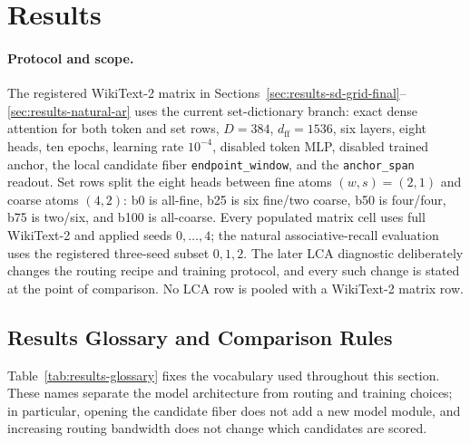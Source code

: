\documentclass{article}
\theoremstyle{plain}
\theoremstyle{definition}
\theoremstyle{remark}
\begin{document}
\section{Results}
\label{sec:results}

\paragraph{Protocol and scope.}
The registered WikiText-2 matrix in
Sections~\ref{sec:results-sd-grid-final}--\ref{sec:results-natural-ar} uses the
current set-dictionary branch: exact dense attention for both token and set
rows, $D=384$, $d_{\mathrm{ff}}=1536$, six layers, eight heads, ten epochs,
learning rate $10^{-4}$, disabled token MLP, disabled trained anchor, the
local candidate fiber \texttt{endpoint\_window}, and the
\texttt{anchor\_span} readout.  Set rows split the eight heads between fine
atoms $(w,s)=(2,1)$ and coarse atoms $(4,2)$: b0 is all-fine, b25 is six
fine/two coarse, b50 is four/four, b75 is two/six, and b100 is all-coarse.
Every populated matrix cell uses full WikiText-2 and applied seeds
$0,\ldots,4$; the natural associative-recall evaluation uses the registered
three-seed subset $0,1,2$.  The later LCA diagnostic deliberately changes the
routing recipe and training protocol, and every such change is stated at the
point of comparison.  No LCA row is pooled with a WikiText-2 matrix row.

\subsection{Results Glossary and Comparison Rules}
\label{sec:results-glossary}

Table~\ref{tab:results-glossary} fixes the vocabulary used throughout this
section.  These names separate the model architecture from routing and
training choices; in particular, opening the candidate fiber does not add a
new model module, and increasing routing bandwidth does not change which
candidates are scored.
\end{document}
